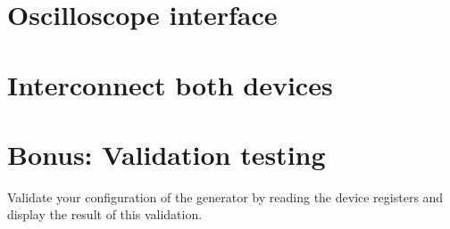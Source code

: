 \documentclass{labo}
\begin{document}
\section{Oscilloscope interface}



\section{Interconnect both devices}



\section{Bonus: Validation testing}
Validate your configuration of the generator by reading the device registers and display the result of this validation.









\end{document}
